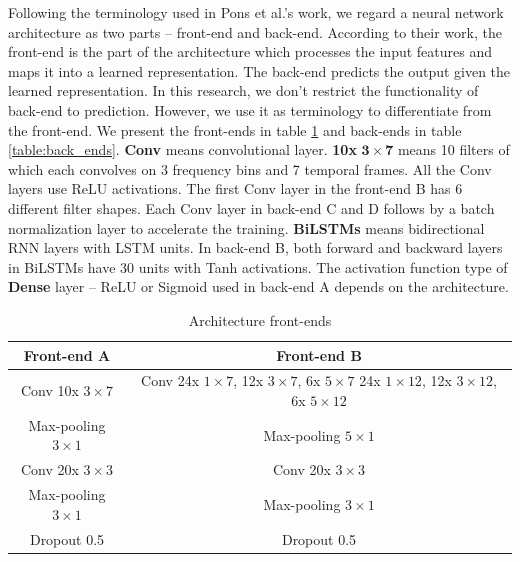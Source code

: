 Following the terminology used in Pons et al.'s work\cite{Pons2017}, we regard a neural network architecture as two parts -- front-end and back-end. According to their work, the front-end is the part of the architecture which processes the input features and maps it into a learned representation. The back-end predicts the output given the learned representation. In this research, we don't restrict the functionality of back-end to prediction. However, we use it as terminology to differentiate from the front-end. We present the front-ends in table \ref{table:frond_ends} and back-ends in table \ref{table:back_ends}. \textbf{\gls{Conv}} means convolutional layer. \textbf{10x} $\boldsymbol{3\times7}$ means 10 filters of which each convolves on 3 frequency bins and 7 temporal frames. All the \gls{Conv} layers use \gls{ReLU} activations. The first \gls{Conv} layer in the front-end B has 6 different filter shapes. Each \gls{Conv} layer in back-end C and D follows by a batch normalization layer to accelerate the training\cite{Ioffe2015}. \textbf{\gls{BiLSTM}s} means bidirectional \gls{RNN} layers with \gls{LSTM} units. In back-end B, both forward and backward layers in \gls{BiLSTM}s have 30 units with Tanh activations. The activation function type of \textbf{Dense} layer -- \gls{ReLU} or Sigmoid used in back-end A depends on the architecture.

\begin{table}[ht!]
\centering
\caption{Architecture front-ends}
\label{table:frond_ends}
\begin{tabular}{c|c}
\toprule
Front-end A & Front-end B \\
\midrule
Conv 10x $3{\times}7$ & \makecell{Conv 24x $1{\times}7$, 12x $3{\times}7$, 6x $5{\times}7$\\24x $1{\times}12$, 12x $3{\times}12$, 6x $5{\times}12$} \\
Max-pooling $3{\times}1$ & Max-pooling $5{\times}1$ \\
Conv 20x $3{\times}3$ & Conv 20x $3{\times}3$ \\
Max-pooling $3{\times}1$ & Max-pooling $3{\times}1$\\
Dropout 0.5 & Dropout 0.5\\
\bottomrule

\end{tabular}
\end{table}

